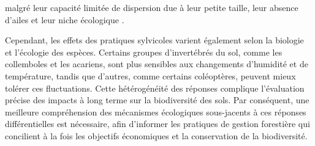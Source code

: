 malgré leur capacité limitée de dispersion due à leur petite taille, leur absence d’ailes et leur niche écologique \citep{Ojala2001Dispersalmicroarthropods}.




 \citep{Kudrin2023metaanalysiseffects}

Cependant, les effets des pratiques sylvicoles varient également selon la biologie et l'écologie des espèces. 
Certains groupes d’invertébrés du sol, comme les collemboles et les acariens, sont plus sensibles aux changements d'humidité et de température, tandis que d'autres, comme certains coléoptères, peuvent mieux tolérer ces fluctuations. 
Cette hétérogénéité des réponses complique l'évaluation précise des impacts à long terme sur la biodiversité des sols. 
Par conséquent, une meilleure compréhension des mécanismes écologiques sous-jacents à ces réponses différentielles est nécessaire, afin d'informer les pratiques de gestion forestière qui concilient à la fois les objectifs économiques et la conservation de la biodiversité.



